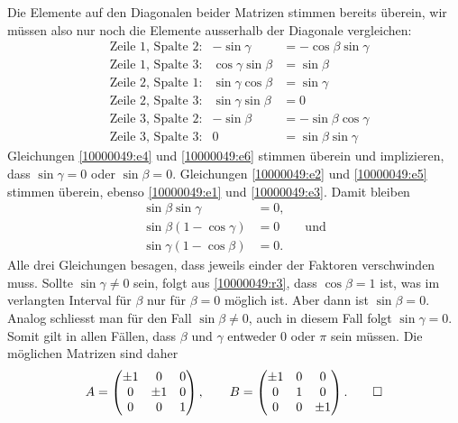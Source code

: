 \begin{loesung}
\begin{teilaufgaben}
Die Elemente auf den Diagonalen beider Matrizen stimmen bereits
überein, wir müssen also nur noch die Elemente ausserhalb der
Diagonale vergleichen:
\begin{align}
&\text{Zeile $1$, Spalte $2$:}
&
-\sin\gamma&=-\cos\beta\sin\gamma
\label{10000049:e1}
\\
&\text{Zeile $1$, Spalte $3$:}
&
\cos\gamma\sin\beta&=\sin\beta
\label{10000049:e2}
\\
&\text{Zeile $2$, Spalte $1$:}
&
\sin\gamma\cos\beta&=\sin\gamma
\label{10000049:e3}
\\
&\text{Zeile $2$, Spalte $3$:}
&
\sin\gamma\sin\beta&=0
\label{10000049:e4}
\\
&\text{Zeile $3$, Spalte $2$:}
&
-\sin\beta&=-\sin\beta\cos\gamma
\label{10000049:e5}
\\
&\text{Zeile $3$, Spalte $3$:}
&
0&=\sin\beta\sin\gamma
\label{10000049:e6}
\end{align}
Gleichungen
\eqref{10000049:e4}
und
\eqref{10000049:e6}
stimmen überein und implizieren, dass $\sin\gamma=0$ oder $\sin\beta=0$.
Gleichungen
\eqref{10000049:e2}
und
\eqref{10000049:e5}
stimmen überein, ebenso
\eqref{10000049:e1}
und
\eqref{10000049:e3}.
Damit bleiben
\begin{align}
\sin\beta   \sin\gamma &=0, \label{10000049:r1}\\
\sin\beta(1-\cos\gamma)&=0\qquad\text{und} \label{10000049:r2}\\
\sin\gamma(1-\cos\beta)&=0.\label{10000049:r3}
\end{align}
Alle drei Gleichungen besagen, dass jeweils einder der Faktoren verschwinden
muss.
Sollte $\sin\gamma\ne0$ sein, folgt aus \eqref{10000049:r3}, dass $\cos\beta=1$
ist, was im verlangten Interval für $\beta$ nur für $\beta=0$  möglich ist.
Aber dann ist $\sin\beta=0$.
Analog schliesst man für den Fall $\sin\beta\ne 0$, auch in diesem Fall folgt
$\sin\gamma=0$.
Somit gilt in allen Fällen, dass $\beta$ und $\gamma$ entweder $0$ oder
$\pi$ sein müssen.
Die möglichen Matrizen sind daher
\[
A=\begin{pmatrix}
\pm1&   0&0\\
   0&\pm1&0\\
   0&   0&1
\end{pmatrix},
\qquad
B=\begin{pmatrix}
\pm1&0&   0\\
   0&1&   0\\
   0&0&\pm1
\end{pmatrix}.
\qedhere
\]
\end{teilaufgaben}
\end{loesung}


